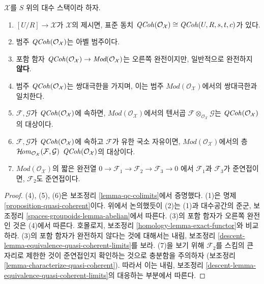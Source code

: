 \begin{lemma}
\label{lemma-quasi-coherent-algebraic-stack}
$\mathcal{X}$를 $S$ 위의 대수 스택이라 하자.
\begin{enumerate}
\item $[U/R] \to \mathcal{X}$가 $\mathcal{X}$의 제시면,
표준 동치
$\mathit{QCoh}(\mathcal{O}_\mathcal{X}) \cong
\mathit{QCoh}(U, R, s, t, c)$가 있다.
\item 범주 $\mathit{QCoh}(\mathcal{O}_\mathcal{X})$는 아벨 범주이다.
\item 포함 함자 $\mathit{QCoh}(\mathcal{O}_\mathcal{X}) \to
\textit{Mod}(\mathcal{O}_\mathcal{X})$는 오른쪽 완전이지만,
일반적으로 완전하지 {\bf 않다}.
\item 범주 $\mathit{QCoh}(\mathcal{O}_\mathcal{X})$는 쌍대극한을 가지며,
이는 범주 $\textit{Mod}(\mathcal{O}_\mathcal{X})$에서의
쌍대극한과 일치한다.
\item $\mathcal{F}, \mathcal{G}$가
$\mathit{QCoh}(\mathcal{O}_\mathcal{X})$에 속하면,
$\textit{Mod}(\mathcal{O}_\mathcal{X})$에서의 텐서곱
$\mathcal{F} \otimes_{\mathcal{O}_\mathcal{X}} \mathcal{G}$는
$\mathit{QCoh}(\mathcal{O}_\mathcal{X})$의 대상이다.
\item $\mathcal{F}, \mathcal{G}$가
$\mathit{QCoh}(\mathcal{O}_\mathcal{X})$에 속하고
$\mathcal{F}$가 유한 국소 자유이면,
$\textit{Mod}(\mathcal{O}_\mathcal{X})$에서의 층
$\mathop{\mathcal{H}\!\mathit{om}}\nolimits_{\mathcal{O}_\mathcal{X}}(\mathcal{F}, \mathcal{G})$
$\mathit{QCoh}(\mathcal{O}_\mathcal{X})$의 대상이다.
\item $\textit{Mod}(\mathcal{O}_\mathcal{X})$의 짧은 완전열
$0 \to \mathcal{F}_1 \to \mathcal{F}_2 \to \mathcal{F}_3 \to 0$
에서 $\mathcal{F}_1$과 $\mathcal{F}_3$가 준연접이면,
$\mathcal{F}_2$도 준연접이다.
\end{enumerate}
\end{lemma}

\begin{proof}
(4), (5), (6)은 보조정리 \ref{lemma-qc-colimits}에서 증명했다.
(1)은 명제 \ref{proposition-quasi-coherent}이다.
위에서 논의했듯이 (2)는 (1)과 대수공간의 준군, 보조정리
\ref{spaces-groupoids-lemma-abelian}에서 따른다.
(3)의 포함 함자가 오른쪽 완전인 것은 (4)에서 따른다.
호몰로지, 보조정리 \ref{homology-lemma-exact-functor}와 비교하라.
(3)의 포함 함자가 완전하지 않다는 것에 대해서는 내림, 보조정리
\ref{descent-lemma-equivalence-quasi-coherent-limits}를 보라.
(7)을 보기 위해 $\mathcal{F}_2$를 스킴의 큰 자리로 제한한 것이
준연접인지 확인하는 것으로 충분함을 주의하자
(보조정리 \ref{lemma-characterize-quasi-coherent}).
따라서 이는 내림, 보조정리
\ref{descent-lemma-equivalence-quasi-coherent-limits}의
대응하는 부분에서 따른다.
\end{proof}

